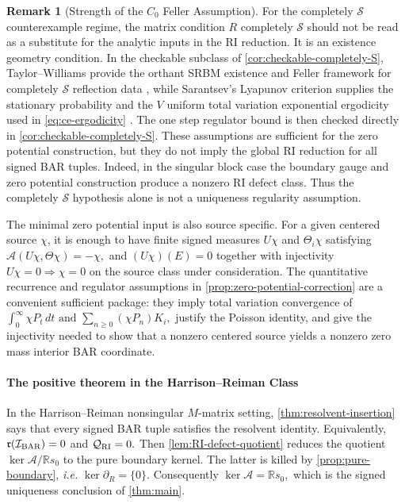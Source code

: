 \documentclass[aihp]{imsart}
\numberwithin{equation}{section}
\theoremstyle{plain}
\theoremstyle{definition}
\newtheorem{remark}[remark]{Remark}
\newcommand{\1}{\mathbf 1}
\begin{document}
\begin{remark}[Strength of the $C_0$ Feller Assumption]
For the completely \(\mathcal S\) counterexample regime, the matrix
condition \(R\) completely \(\mathcal S\) should not be read as a substitute
for the analytic inputs in the RI reduction.  It is an existence geometry
condition.  In the checkable subclass of \cref{cor:checkable-completely-S},
Taylor--Williams provide the orthant SRBM existence and Feller framework for
completely \(\mathcal S\) reflection data \cite{TaylorWilliams1993}, while
Sarantsev's Lyapunov criterion supplies the stationary probability and the
\(V\) uniform total variation exponential ergodicity used in
\eqref{eq:ce-ergodicity} \cite[Corollary~3.2]{Sarantsev2017}.  The
one step regulator bound is then checked directly in
\cref{cor:checkable-completely-S}.  These assumptions are sufficient for the
zero potential construction, but they do not imply the global RI reduction
for all signed BAR tuples.  Indeed, in the singular block case the boundary
gauge and zero potential construction produce a nonzero RI defect class.
Thus the completely \(\mathcal S\) hypothesis alone is not a uniqueness
regularity assumption.

The minimal zero potential input is also source specific.  For a given
centered source \(\chi\), it is enough to have finite signed measures
\(U\chi\) and \(\Theta_i\chi\) satisfying $\mathcal A(U\chi,\Theta\chi)=-\chi,$ and  $(U\chi)(E)=0$ together with injectivity \(U\chi=0\Rightarrow \chi=0\) on the source class
under consideration.  The quantitative recurrence and regulator assumptions
in \cref{prop:zero-potential-correction} are a convenient sufficient package:
they imply total variation convergence of
\(
        \int_0^\infty \chi P_t\,dt
        \text{ and }
        \sum_{n\ge0}(\chi P_n)K_i,
\)
justify the Poisson identity, and give the injectivity needed to show that a
nonzero centered source yields a nonzero zero mass interior BAR coordinate.
\end{remark}

\paragraph{The positive theorem in the Harrison--Reiman Class} In the Harrison--Reiman nonsingular $M$-matrix setting, \cref{thm:resolvent-insertion} says that every signed BAR tuple satisfies the resolvent identity.  Equivalently, $\mathfrak r(\mathcal I_{\rm BAR})=0$ and $\mathcal Q_{\rm RI}=0.$ Then \cref{lem:RI-defect-quotient} reduces the quotient $\ker\mathcal A/\mathbb R s_0$ to the pure boundary kernel.  The latter is killed by \cref{prop:pure-boundary}, \emph{i.e.} $\ker\partial_R=\{0\}.$ Consequently $\ker\mathcal A=\mathbb R s_0,$ which is the signed uniqueness conclusion of \cref{thm:main}.
\end{document}
